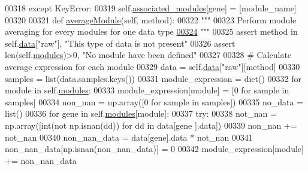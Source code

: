 \begin{DoxyCode}
00318                 \textcolor{keywordflow}{except} KeyError:
00319                     self.\hyperlink{classnavicom_1_1navicom_1_1NaviCom_a9f3e4dbfabe319967c14bf61eaf8d022}{associated_modules}[gene] = [module\_name]
00320 
00321     \textcolor{keyword}{def }\hyperlink{classnavicom_1_1navicom_1_1NaviCom_afd1a299b687bc97e171cff0a738b7b73}{averageModule}(self, method):
00322         \textcolor{stringliteral}{"""}
00323 \textcolor{stringliteral}{        Perform module averaging for every modules for one data type}
\hypertarget{navicom_8py_source_l00324}{}\hyperlink{classnavicom_1_1navicom_1_1NaviCom_afd1a299b687bc97e171cff0a738b7b73}{00324} \textcolor{stringliteral}{        """}
00325         \textcolor{keyword}{assert} method \textcolor{keywordflow}{in} self.\hyperlink{classnavicom_1_1navicom_1_1NaviCom_aa1abff245573ed8406c6bddb4596f093}{data}[\textcolor{stringliteral}{"raw"}], \textcolor{stringliteral}{"This type of data is not present"}
00326         \textcolor{keyword}{assert} len(self.\hyperlink{classnavicom_1_1navicom_1_1NaviCom_a56141660ddf29a36a8291e938246578c}{modules})>0, \textcolor{stringliteral}{"No module have been defined"}
00327 
00328         \textcolor{comment}{# Calculate average expression for each module}
00329         data = self.\hyperlink{classnavicom_1_1navicom_1_1NaviCom_aa1abff245573ed8406c6bddb4596f093}{data}[\textcolor{stringliteral}{"raw"}][method]
00330         samples = list(data.samples.keys())
00331         module\_expression = dict()
00332         \textcolor{keywordflow}{for} module \textcolor{keywordflow}{in} self.\hyperlink{classnavicom_1_1navicom_1_1NaviCom_a56141660ddf29a36a8291e938246578c}{modules}:
00333             module\_expression[module] = [0 \textcolor{keywordflow}{for} sample \textcolor{keywordflow}{in} samples]
00334             non\_nan = np.array([0 \textcolor{keywordflow}{for} sample \textcolor{keywordflow}{in} samples])
00335             no\_data = list()
00336             \textcolor{keywordflow}{for} gene \textcolor{keywordflow}{in} self.\hyperlink{classnavicom_1_1navicom_1_1NaviCom_a56141660ddf29a36a8291e938246578c}{modules}[module]:
00337                 \textcolor{keywordflow}{try}:
00338                     not\_nan = np.array([int(\textcolor{keywordflow}{not} np.isnan(dd)) \textcolor{keywordflow}{for} dd \textcolor{keywordflow}{in} data[gene
      ].data])
00339                     non\_nan += not\_nan
00340                     non\_nan\_data = data[gene].data * not\_nan
00341                     non\_nan\_data[np.isnan(non\_nan\_data)] = 0
00342                     module\_expression[module] += non\_nan\_data

\end{DoxyCode}
